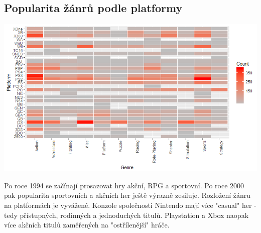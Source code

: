 \documentclass[a4paper,11pt]{article}
\begin{document}
\subsection{Popularita žánrů podle platformy}
\includegraphics[scale=0.65]{Rplot09}

Po roce 1994 se začínají prosazovat hry akční, RPG a sportovní. Po roce 2000 pak popularita sportovních a akčních her ještě výrazně zesiluje. Rozložení žánru na platformách je vyvážené. Konzole společnosti Nintendo mají více "casual" her - tedy přístupných, rodinných a jednoduchých titulů. Playstation a Xbox naopak více akčních titulů zaměřených na "ostřílenější" hráče.
\end{document}
